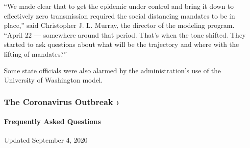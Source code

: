 ``We made clear that to get the epidemic under control and bring it down
to effectively zero transmission required the social distancing mandates
to be in place,'' said Christopher J. L. Murray, the director of the
modeling program. ``April 22 --- somewhere around that period. That's
when the tone shifted. They started to ask questions about what will be
the trajectory and where with the lifting of mandates?''

Some state officials were also alarmed by the administration's use of
the University of Washington model.

\href{https://www.nytimes3xbfgragh.onion/news-event/coronavirus?action=click\&pgtype=Article\&state=default\&region=MAIN_CONTENT_3\&context=storylines_faq}{}

\hypertarget{the-coronavirus-outbreak-}{%
\subsubsection{The Coronavirus Outbreak
›}\label{the-coronavirus-outbreak-}}

\hypertarget{frequently-asked-questions}{%
\paragraph{Frequently Asked
Questions}\label{frequently-asked-questions}}

Updated September 4, 2020

